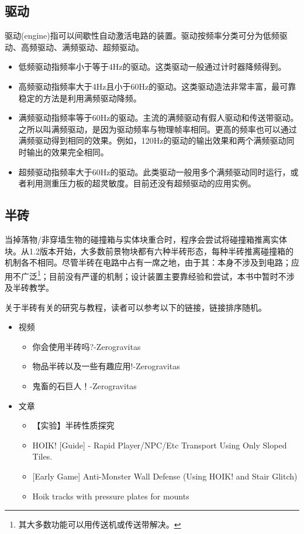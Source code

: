 \subsection{驱动}

驱动(engine)指可以间歇性自动激活电路的装置。驱动按频率分类可分为低频驱动、高频驱动、满频驱动、超频驱动。

\begin{itemize}
\item 低频驱动指频率小于等于4Hz的驱动。这类驱动一般通过计时器降频得到。
\item 高频驱动指频率大于4Hz且小于60Hz的驱动。这类驱动造法非常丰富，最可靠稳定的方法是利用满频驱动降频。
\item 满频驱动指频率等于60Hz的驱动。主流的满频驱动有假人驱动和传送带驱动。之所以叫满频驱动，是因为驱动频率与物理帧率相同。更高的频率也可以通过满频驱动得到相同的效果。例如，120Hz的驱动的输出效果和两个满频驱动同时输出的效果完全相同。
\item 超频驱动指频率大于60Hz的驱动。此类驱动一般用多个满频驱动同时运行，或者利用测重压力板的超灵敏度。目前还没有超频驱动的应用实例。
\end{itemize}

\subsection{半砖}

当掉落物/非穿墙生物的碰撞箱与实体块重合时，程序会尝试将碰撞箱推离实体块。从1.2版本开始，大多数前景物块都有六种半砖形态，每种半砖推离碰撞箱的机制各不相同。尽管半砖在电路中占有一席之地，由于其：本身不涉及到电路；应用不广泛\footnote{其大多数功能可以用传送机或传送带解决。}；目前没有严谨的机制；设计装置主要靠经验和尝试，本书中暂时不涉及半砖教学。

关于半砖有关的研究与教程，读者可以参考以下的链接，链接排序随机。

\begin{itemize}
\item 视频
\begin{itemize}
\item 你会使用半砖吗?-Zerogravitas  
\item 物品半砖以及一些有趣应用!-Zerogravitas 
\item 鬼畜的石巨人！-Zerogravitas 
\end{itemize}
\item 文章
\begin{itemize}
\item 【实验】半砖性质探究 
\item HOIK! [Guide] - Rapid Player/NPC/Etc Transport Using Only Sloped Tiles. 
\item {[}Early Game] Anti-Monster Wall Defense (Using HOIK! and Stair Glitch) 
\item Hoik tracks with pressure plates for mounts 
\end{itemize}
\end{itemize}

